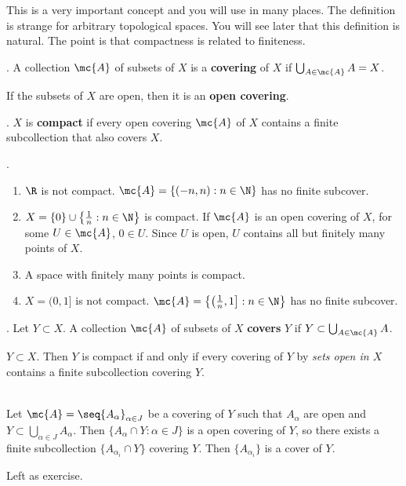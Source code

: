 \vspace*{-10pt}


This is a very important concept and you will use in many places. The definition is strange for arbitrary topological spaces. You will see later that this definition is natural. The point is that compactness is related to finiteness.

.  A collection \(\mc{A}\) of subsets of \(X\) is a \textbf{covering} of \(X\) if \(\bigcup_{A \in \mc{A}} A = X\).

If the subsets of \(X\) are open, then it is an \textbf{open covering}.

.  \(X\) is \textbf{compact} if every open covering \(\mc{A}\) of \(X\) contains a finite subcollection that also covers \(X\).

\ex.
\begin{enumerate}
    \item \(\R\) is not compact. \(\mc{A} = \{(-n, n) : n \in \N\}\) has no finite subcover.
    \item \(X = \{0\} \cup \left\{\frac{1}{n} : n \in \N \right\}\) is compact. If \(\mc{A}\) is an open covering of \(X\), for some \(U \in \mc{A}\), \(0 \in U\). Since \(U\) is open, \(U\) contains all but finitely many points of \(X\).
    \item A space with finitely many points is compact.
    \item \(X = (0, 1]\) is not compact. \(\mc{A} = \left\{\left(\frac{1}{n}, 1\right] : n \in \N\right\}\) has no finite subcover.
\end{enumerate}

. Let \(Y \subset X\). A collection \(\mc{A}\) of subsets of \(X\) \textbf{covers} \(Y\) if \(Y \subset \bigcup_{A \in \mc{A}} A\).

 \(Y \subset X\). Then \(Y\) is compact if and only if every covering of \(Y\) by \textit{sets open in \(X\)} contains a finite subcollection covering \(Y\).

\pf \\
\note{\mimp} Let \(\mc{A} = \seq{A_\alpha}_{\alpha \in J}\) be a covering of \(Y\) such that \(A_\alpha\) are open and \(Y \subset \bigcup_{\alpha \in J} A_\alpha\). Then \(\{A_\alpha \cap Y : \alpha \in J\}\) is a open covering of \(Y\), so there exists a finite subcollection \(\{A_{\alpha_i} \cap Y\}\) covering \(Y\). Then \(\{A_{\alpha_i}\}\) is a cover of \(Y\).

\note{\mimpd} Left as exercise.

